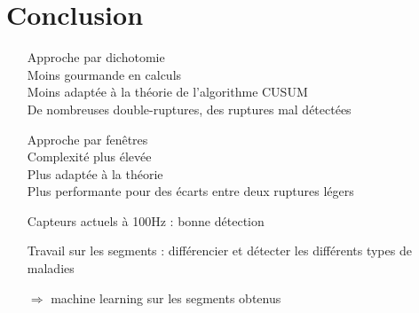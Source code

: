 \documentclass{beamer}
\begin{document}

\section{Conclusion}

\begin{frame}

\begin{itemize}

	\item[Approche] par dichotomie
			\\ Moins gourmande en calculs
			\\ Moins adaptée à la théorie de l'algorithme CUSUM
			\\ De nombreuses double-ruptures, des ruptures mal détectées
	
	\item[Approche] par fenêtres
			\\ Complexité plus élevée
			\\ Plus adaptée à la théorie
			\\ Plus performante pour des écarts entre deux ruptures légers
	
	\item[Capteurs] actuels à 100Hz : bonne détection
	
	\item[Travail] sur les segments : différencier et détecter les différents types de maladies
	\item[$\Longrightarrow$] machine learning sur les segments obtenus
	\vspace*{1cm}

\end{itemize}

\end{frame}
\end{document}
